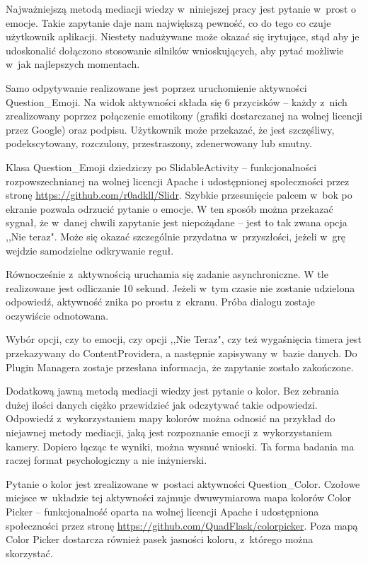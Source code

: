 Najważniejszą metodą mediacji wiedzy w~niniejszej pracy jest pytanie w~prost o emocje. Takie zapytanie daje nam największą pewność, co do tego co czuje użytkownik aplikacji. Niestety nadużywane może okazać się irytujące, stąd aby je udoskonalić dołączono stosowanie silników wnioskujących, aby pytać możliwie w~jak najlepszych momentach. 

Samo odpytywanie realizowane jest poprzez uruchomienie aktywności Question\_Emoji. Na widok aktywności składa się 6 przycisków -- każdy z~nich zrealizowany poprzez połączenie emotikony (grafiki dostarczanej na wolnej licencji przez Google) oraz podpisu. Użytkownik może przekazać, że jest szczęśliwy, podekscytowany, rozczulony, przestraszony, zdenerwowany lub smutny.

Klasa Question\_Emoji dziedziczy po SlidableActivity -- funkcjonalności rozpowszechnianej na wolnej licencji Apache i udostępnionej społeczności przez stronę \url{https://github.com/r0adkll/Slidr}. Szybkie przesunięcie palcem w~bok po ekranie pozwala odrzucić pytanie o emocje. W ten sposób można przekazać sygnał, że w~danej chwili zapytanie jest niepożądane -- jest to tak zwana opcja ,,Nie teraz". Może się okazać szczególnie przydatna w~przyszłości, jeżeli w~grę wejdzie samodzielne odkrywanie reguł.

Równocześnie z~aktywnością uruchamia się zadanie asynchroniczne. W tle realizowane jest odliczanie 10 sekund. Jeżeli w~tym czasie nie zostanie udzielona odpowiedź, aktywność znika po prostu z~ekranu. Próba dialogu zostaje oczywiście odnotowana.

Wybór opcji, czy to emocji, czy opcji ,,Nie Teraz", czy też wygaśnięcia timera jest przekazywany do ContentProvidera, a następnie zapisywany w~bazie danych. Do Plugin Managera zostaje przesłana informacja, że zapytanie zostało zakończone.

Dodatkową jawną metodą mediacji wiedzy jest pytanie o kolor. Bez zebrania dużej ilości danych ciężko przewidzieć jak odczytywać takie odpowiedzi. Odpowiedź z~wykorzystaniem mapy kolorów można odnosić na przykład do niejawnej metody mediacji, jaką jest rozpoznanie emocji z~wykorzystaniem kamery. Dopiero łącząc te wyniki, można wysnuć wnioski. Ta forma badania ma raczej format psychologiczny a nie inżynierski. 

Pytanie o kolor jest zrealizowane w~postaci aktywności Question\_Color. Czołowe miejsce w~układzie tej aktywności zajmuje dwuwymiarowa mapa kolorów Color Picker -- funkcjonalność oparta na wolnej licencji Apache i udostępniona społeczności przez stronę \url{https://github.com/QuadFlask/colorpicker}. Poza mapą Color Picker dostarcza również pasek jasności koloru, z~którego można skorzystać. 

